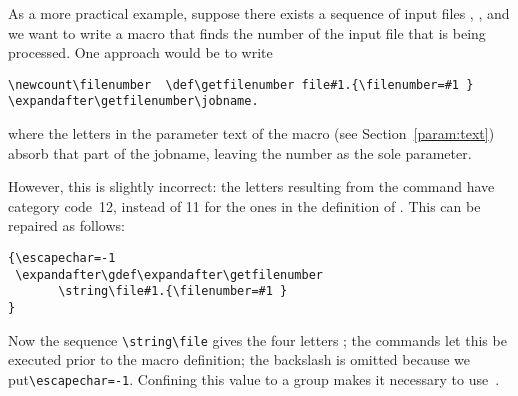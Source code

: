 \documentclass{book}
\begin{document}
As a more practical example, suppose there exists a sequence
of input files , \label{ex:jobnumber},
and we want to
write a macro that finds the number of the input file
that is being processed. One approach would be to write
\begin{verbatim}
\newcount\filenumber  \def\getfilenumber file#1.{\filenumber=#1 }
\expandafter\getfilenumber\jobname.
\end{verbatim}
where the letters  in the parameter text of the
macro (see Section~\ref{param:text}) absorb that part of the
jobname, leaving the number as the sole parameter.

However, this is slightly incorrect: the letters  resulting
from the  command have category code~12, instead of
11 for the ones in the definition of .
This can be repaired as follows:
\begin{verbatim}
{\escapechar=-1
 \expandafter\gdef\expandafter\getfilenumber
       \string\file#1.{\filenumber=#1 }
}
\end{verbatim}
Now the sequence \verb>\string\file> gives the four
letters ; 
the  commands let this be executed prior to
the macro definition;
the backslash is omitted because we put\handbreak \verb>\escapechar=-1>.
Confining this value to a group makes it necessary to use~.
\end{document}
